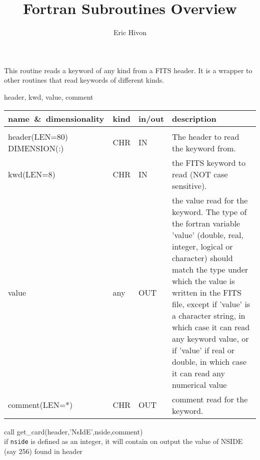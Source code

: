 
\sloppy

\title{\healpix Fortran Subroutines Overview}
 \section[get\_card]{ }
\label{sub:get_card}
\author{Eric Hivon}

\begin{facility}
{This routine reads a keyword of any kind from a FITS header. It is a wrapper to
other routines that read keywords of different kinds.}
{\modHeadFits}
\end{facility}

\begin{f90format}
{header, kwd, value, comment}
\end{f90format}

\begin{arguments}
{
\begin{tabular}{p{0.4\hsize} p{0.05\hsize} p{0.1\hsize} p{0.35\hsize}} \hline  
\textbf{name~\&~dimensionality} & \textbf{kind} & \textbf{in/out} & \textbf{description} \\ \hline
                   &   &   &                           \\ %
header(LEN=80) DIMENSION(:) & CHR & IN & The header to read the keyword from. \\
kwd(LEN=8) & CHR & IN & the FITS keyword to read (NOT case sensitive). \\
value & any & OUT & the value read for the keyword. 
The type of the fortran variable 'value' (double, real, integer, logical or
                   character) should match the type under which the
                   value is written in the FITS file, except if
                   'value' is a character string, in which case it can read any
                   keyword value, or if 'value' if real or double, in which case
                   it can read any numerical value\\
comment(LEN=*) & CHR & OUT & comment read for the keyword. \\ 
\end{tabular}
}
\end{arguments}

\begin{example}
{
call get\_card(header,'NsIdE',nside,comment)  \\
}
{
if {\tt nside} is defined as an integer, it
will contain on output the value of NSIDE (say 256) found in header
}
\end{example}

